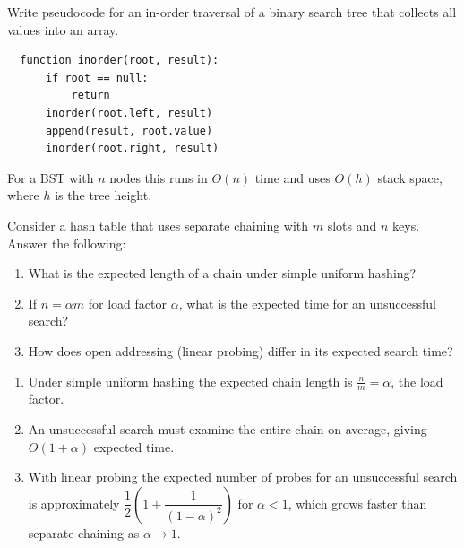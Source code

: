 \documentclass[
    language=english,
    doctype=homework,
    institution=none,
]{../../omnilatex}
\begin{document}
\begin{exercise}[10]
Write pseudocode for an in-order traversal of a binary search tree that
collects all values into an array.
\end{exercise}
\begin{solution}
\begin{verbatim}
  function inorder(root, result):
      if root == null:
          return
      inorder(root.left, result)
      append(result, root.value)
      inorder(root.right, result)
\end{verbatim}
For a BST with $n$ nodes this runs in $O(n)$ time and uses $O(h)$ stack
space, where $h$ is the tree height.
\end{solution}

\begin{exercise}[15]
Consider a hash table that uses separate chaining with $m$ slots and $n$
keys. Answer the following:

\begin{enumerate}
    \item[(a)] What is the expected length of a chain under simple uniform
          hashing?
    \item[(b)] If $n = \alpha m$ for load factor $\alpha$, what is the
          expected time for an unsuccessful search?
    \item[(c)] How does open addressing (linear probing) differ in its
          expected search time?
\end{enumerate}
\end{exercise}
\begin{solution}
\begin{enumerate}
    \item[(a)] Under simple uniform hashing the expected chain length is
          $\displaystyle\frac{n}{m} = \alpha$, the load factor.
    \item[(b)] An unsuccessful search must examine the entire chain on
          average, giving $O(1 + \alpha)$ expected time.
    \item[(c)] With linear probing the expected number of probes for an
          unsuccessful search is approximately
          $\dfrac{1}{2}\!\left(1 + \dfrac{1}{(1-\alpha)^{2}}\right)$
          for $\alpha < 1$, which grows faster than separate chaining as
          $\alpha \to 1$.
\end{enumerate}
\end{solution}
\end{document}
